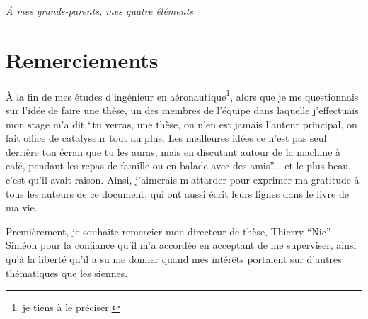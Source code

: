 \documentclass[english,a4paper,11pt,twoside]{StyleThese}
\begin{document}
\makeflyleaf

\cleardoublepage

\begin{flushright}
    \thispagestyle{empty}
    \textit{À mes grands-parents, mes quatre éléments}
\end{flushright}
\cleardoublepage

\dominitoc


\cleardoublepage

%
%
\section*{Remerciements}

À la fin de mes études d'ingénieur en aéronautique\footnote{je tiens à le préciser.}, alors que je me questionnais sur l'idée de faire une thèse, un des membres de l'équipe dans laquelle j'effectuais mon stage m'a dit ``tu verras, une thèse, on n'en est jamais l'auteur principal, on fait office de catalyseur tout au plus. Les meilleures idées ce n'est pas seul derrière ton écran que tu les auras, mais en discutant autour de la machine à café, pendant les repas de famille ou en balade avec des amis''... et le plus beau, c'est qu'il avait raison. Ainsi, j'aimerais m'attarder pour exprimer ma gratitude à tous les auteurs de ce document, qui ont aussi écrit leurs lignes dans le livre de ma vie.

Premièrement, je souhaite remercier mon directeur de thèse, Thierry ``Nic'' Siméon pour la confiance qu'il m'a accordée en acceptant de me superviser, ainsi qu'à la liberté qu'il a su me donner quand mes intérêts portaient sur d'autres thématiques que les siennes.
\end{document}
